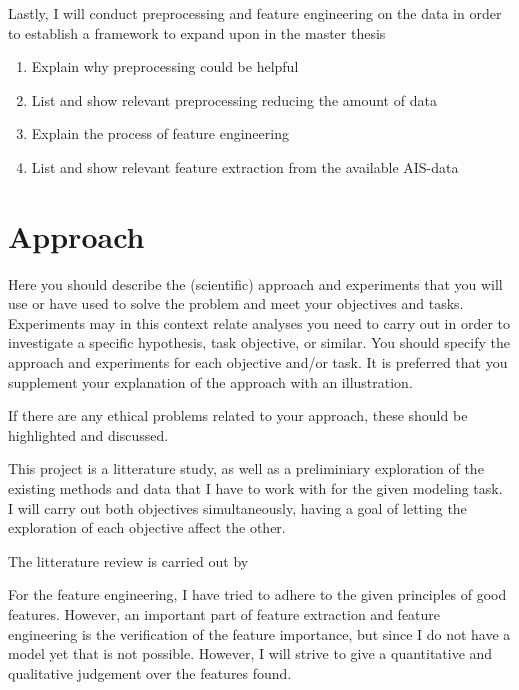 Lastly, I will conduct preprocessing and feature engineering on the data in order to establish a framework to expand upon in the master thesis
\begin{enumerate}
	\item Explain why preprocessing could be helpful
	\item List and show relevant preprocessing reducing the amount of data
	\item Explain the process of feature engineering
	\item List and show relevant feature extraction from the available AIS-data
\end{enumerate}


\section{Approach}
\label{sec:approach}
\begin{info}
	Here you should describe the (scientific) approach and experiments that you will use or have used to solve the problem and meet your objectives and tasks. Experiments may in this context relate analyses you need to carry out in order to investigate a specific hypothesis, task objective, or similar. You should specify the approach and experiments for each objective and/or task. It is preferred that you supplement your explanation of the approach with an illustration.

	If there are any ethical problems related to your approach, these should be highlighted and discussed.
\end{info}
This project is a litterature study, as well as a preliminiary exploration of the existing methods and data that I have to work with for the given modeling task. I will carry out both objectives simultaneously, having a goal of letting the exploration of each objective affect the other. 

The litterature review is carried out by  

For the feature engineering, I have tried to adhere to the given principles of good features. However, an important part of feature extraction and feature engineering is the verification of the feature importance, but since I do not have a model yet that is not possible. However, I will strive to give a quantitative and qualitative judgement over the features found. 




